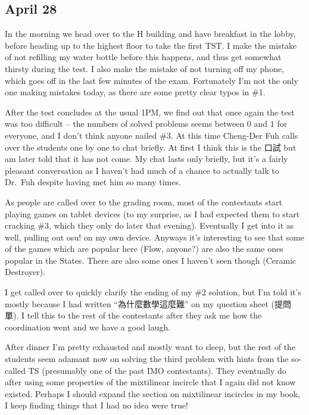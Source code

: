 \documentclass[11pt]{scrreprt}
\begin{document}
\subsection{April 28}
In the morning we head over to the H building and have breakfast in the lobby,
before heading up to the highest floor to take the first TST.
I make the mistake of not refilling my water bottle before this happens,
and thus get somewhat thirsty during the test.
I also make the mistake of not turning off my phone, which goes off in the last few minutes of the exam.
Fortunately I'm not the only one making mistakes today, as there are some pretty clear typos in \#1.

After the test concludes at the usual 1PM,
we find out that once again the test was too difficult -- the numbers of solved
problems seems between $0$ and $1$ for everyone, and I don't think anyone nailed \#3.
At this time Cheng-Der Fuh calls over the students one by one to chat briefly.
At first I think this is the 口試 but am later told that it has not come.
My chat lasts only briefly, but it's a fairly pleasant conversation as I haven't
had much of a chance to actually talk to Dr.\ Fuh despite having met him so many times.

As people are called over to the grading room,
most of the contestants start playing games on tablet devices (to my surprise,
as I had expected them to start cracking \#3, which they only do later that evening).
Eventually I get into it as well, pulling out {osu!} on my own device.
Anyways it's interesting to see that some of the games which are popular here (Flow,
anyone?) are also the same ones popular in the States.
There are also some ones I haven't seen though (Ceramic Destroyer).

I get called over to quickly clarify the ending of my \#2 solution,
but I'm told it's mostly because I had written ``為什麼數學這麼難'' on my question sheet (提問單).
I tell this to the rest of the contestants after they ask me how the
coordination went and we have a good laugh.

After dinner I'm pretty exhausted and mostly want to sleep,
but the rest of the students seem adamant now on solving the third problem with
hints from the so-called TS (presumably one of the past IMO contestants).
They eventually do after using some properties of the mixtilinear incircle that I again did not know existed.
Perhaps I should expand the section on mixtilinear incircles in my book,
I keep finding things that I had no idea were true!
\end{document}
